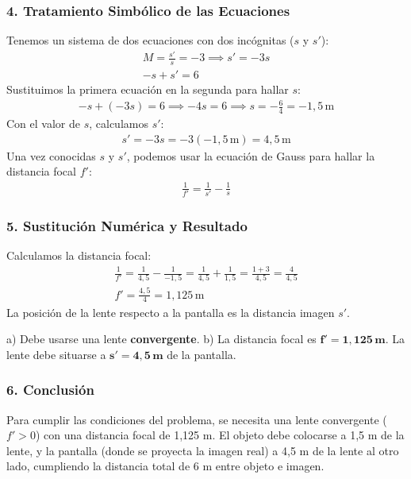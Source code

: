 \subsubsection*{4. Tratamiento Simbólico de las Ecuaciones}
Tenemos un sistema de dos ecuaciones con dos incógnitas ($s$ y $s'$):
\begin{gather}
    M = \frac{s'}{s} = -3 \implies s' = -3s \\
    -s + s' = 6
\end{gather}
Sustituimos la primera ecuación en la segunda para hallar $s$:
\begin{gather}
    -s + (-3s) = 6 \implies -4s = 6 \implies s = -\frac{6}{4} = -1,5\,\text{m}
\end{gather}
Con el valor de $s$, calculamos $s'$:
\begin{gather}
    s' = -3s = -3(-1,5\,\text{m}) = 4,5\,\text{m}
\end{gather}
Una vez conocidas $s$ y $s'$, podemos usar la ecuación de Gauss para hallar la distancia focal $f'$:
\begin{gather}
    \frac{1}{f'} = \frac{1}{s'} - \frac{1}{s}
\end{gather}

\subsubsection*{5. Sustitución Numérica y Resultado}
Calculamos la distancia focal:
\begin{gather}
    \frac{1}{f'} = \frac{1}{4,5} - \frac{1}{-1,5} = \frac{1}{4,5} + \frac{1}{1,5} = \frac{1+3}{4,5} = \frac{4}{4,5} \\
    f' = \frac{4,5}{4} = 1,125\,\text{m}
\end{gather}
La posición de la lente respecto a la pantalla es la distancia imagen $s'$.
\begin{cajaresultado}
a) Debe usarse una lente \textbf{convergente}.
b) La distancia focal es $\boldsymbol{f' = 1,125\,\textbf{m}}$. La lente debe situarse a $\boldsymbol{s' = 4,5\,\textbf{m}}$ de la pantalla.
\end{cajaresultado}

\subsubsection*{6. Conclusión}
\begin{cajaconclusion}
Para cumplir las condiciones del problema, se necesita una lente convergente ($f'>0$) con una distancia focal de 1,125 m. El objeto debe colocarse a 1,5 m de la lente, y la pantalla (donde se proyecta la imagen real) a 4,5 m de la lente al otro lado, cumpliendo la distancia total de 6 m entre objeto e imagen.
\end{cajaconclusion}
\newpage

